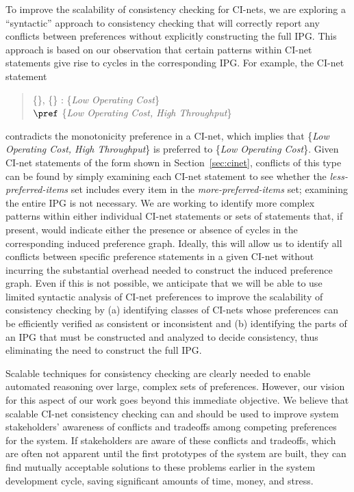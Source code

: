 To improve the scalability of consistency checking for CI-nets, we are exploring a ``syntactic'' approach to consistency checking that will correctly report any conflicts between preferences without explicitly constructing the full IPG. This approach is based on our observation that certain patterns within CI-net statements give rise to cycles in the corresponding IPG. For example, the CI-net statement 
\begin{quote}
\{\}, \{\} : \{\emph{Low Operating Cost}\} \\
$\pref$ \{\emph{Low Operating Cost, High Throughput}\}
\end{quote}
contradicts the monotonicity preference in a CI-net, which implies that \{\emph{Low Operating Cost, High Throughput}\} is preferred to \{\emph{Low Operating Cost}\}. 
Given CI-net statements of the form shown in Section~\ref{sec:cinet}, conflicts of this type can be found by simply examining each CI-net statement to see whether the \emph{less-preferred-items} set includes every item in the \emph{more-preferred-items} set; examining the entire IPG is not necessary. We are working to identify more complex patterns within either individual CI-net statements or sets of statements that, if present, would indicate either the presence or absence of cycles in the corresponding induced preference graph. Ideally, this will allow us to identify all conflicts between specific preference statements in a given CI-net without incurring the substantial overhead needed to construct the induced preference graph. Even if this is not possible, we anticipate that we will be able to use limited syntactic analysis of CI-net preferences to improve the scalability of consistency checking by (a) identifying classes of CI-nets whose preferences can be efficiently verified as consistent or inconsistent and (b) identifying the parts of an IPG that must be constructed and analyzed to decide consistency, thus eliminating the need to construct the full IPG.

Scalable techniques for consistency checking are clearly needed to enable automated reasoning over large, complex sets of preferences. However, our vision for this aspect of our work goes beyond this immediate objective. We believe that scalable CI-net consistency checking can and should be used to improve system stakeholders' awareness of conflicts and tradeoffs among competing preferences for the system. If stakeholders are aware of these conflicts and tradeoffs, which are often not apparent until the first prototypes of the system are built, they can find mutually acceptable solutions to these problems earlier in the system development cycle, saving significant amounts of time, money, and stress.


